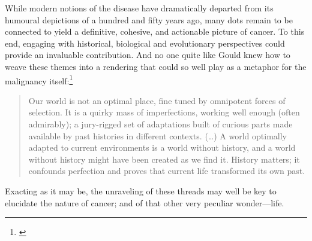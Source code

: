 


\bigskip{}

While modern notions of the disease have dramatically departed from its humoural
depictions of a hundred and fifty years ago, many dots remain to be connected to
yield a definitive, cohesive, and actionable picture of cancer.  To this end,
engaging with historical, biological and evolutionary perspectives could provide
an invaluable contribution.  And no one quite like Gould knew how to weave these
themes into a rendering that could so well play as a metaphor for the malignancy
itself:\footnote{\citealp[p. 54]{gould_flamingos_1987}}

\begin{quotation}
  Our world is not an optimal place, fine tuned by omnipotent forces of
  selection.  It is a quirky mass of imperfections, working well enough (often
  admirably); a jury-rigged set of adaptations built of curious parts made
  available by past histories in different contexts.  (\ldots) A world optimally
  adapted to current environments is a world without history, and a world
  without history might have been created as we find it.  History matters; it
  confounds perfection and proves that current life transformed its own past.
\end{quotation}

Exacting as it may be, the unraveling of these threads may well be key to
elucidate the nature of cancer; and of that other very peculiar wonder---life.

\clearpage


